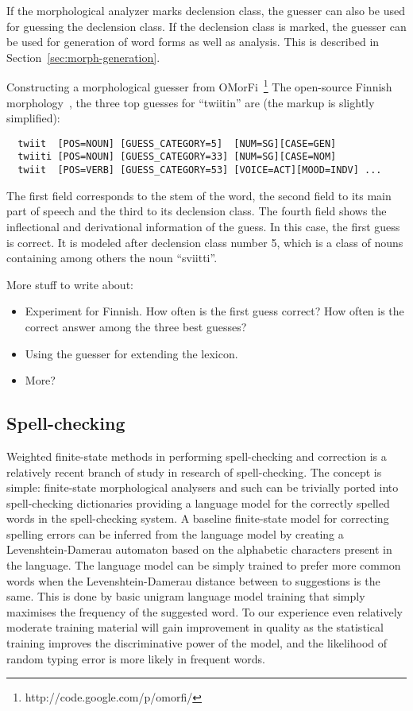 \documentclass{llncs}
\begin{document}
If the morphological analyzer marks declension class, the guesser can
also be used for guessing the declension class. If the declension
class is marked, the guesser can be used for generation of word forms
as well as analysis. This is described in
Section~\ref{sec:morph-generation}.

Constructing a morphological guesser from
OMorFi~\footnote{http://code.google.com/p/omorfi/} The open-source
Finnish morphology~\cite{pirinen/2008}, the three top guesses for
``twiitin'' are (the markup is slightly simplified): \small
\begin{verbatim}
  twiit  [POS=NOUN] [GUESS_CATEGORY=5]  [NUM=SG][CASE=GEN]
  twiiti [POS=NOUN] [GUESS_CATEGORY=33] [NUM=SG][CASE=NOM]
  twiit  [POS=VERB] [GUESS_CATEGORY=53] [VOICE=ACT][MOOD=INDV] ...
\end{verbatim}
\normalsize
The first field corresponds to the stem of the word, the second field
to its main part of speech and the third to its declension class. The
fourth field shows the inflectional and derivational information of
the guess. In this case, the first guess is correct. It is modeled
after declension class number 5, which is a class of nouns containing
among others the noun ``sviitti''.


More stuff to write about:
\begin{itemize}
\item Experiment for Finnish. How often is the first guess correct?
  How often is the correct answer among the three best guesses?
\item Using the guesser for extending the lexicon.
\item More?
\end{itemize}

\subsection{Spell-checking}

Weighted finite-state methods in performing spell-checking and correction is a
relatively recent branch of study in research of spell-checking. The concept is
simple: finite-state morphological analysers and such can be trivially ported
into spell-checking dictionaries providing a language model for the correctly
spelled words in the spell-checking system. A baseline finite-state model for
correcting spelling errors can be inferred from the language model by creating
a Levenshtein-Damerau automaton based on the alphabetic characters present in
the language. The language model can be simply trained to prefer more common
words when the Levenshtein-Damerau distance between to suggestions is the same.
This is done by basic unigram language model training that simply maximises
the frequency of the suggested word. To our experience even relatively moderate
training material will gain improvement in quality as the statistical training
improves the discriminative power of the model, and the likelihood of random
typing error is more likely in frequent words.
\end{document}
